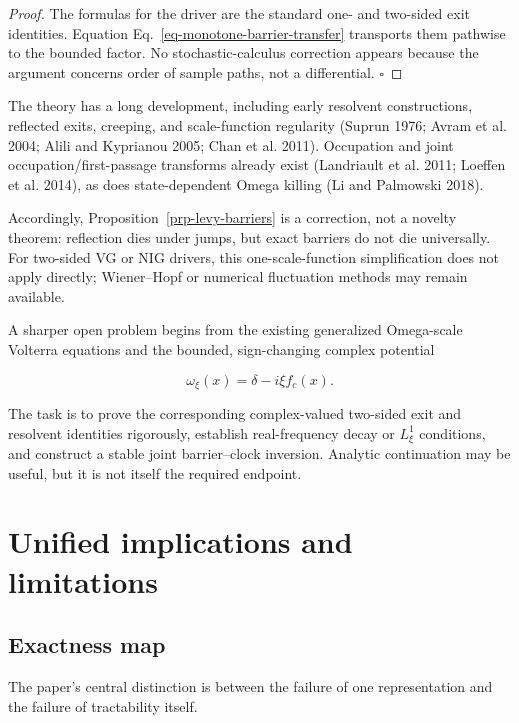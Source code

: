\documentclass[
  english,
  11pt,
  letterpaper,
  DIV=11,
  numbers=noendperiod]{scrartcl}
\theoremstyle{plain}
\theoremstyle{plain}
\theoremstyle{plain}
\theoremstyle{plain}
\theoremstyle{remark}
\begin{document}
\begin{proof}
The formulas for the driver are the standard one- and two-sided exit
identities. Equation Eq.~\ref{eq-monotone-barrier-transfer} transports
them pathwise to the bounded factor. No stochastic-calculus correction
appears because the argument concerns order of sample paths, not a
differential. \(\square\)
\end{proof}

The theory has a long development, including early resolvent
constructions, reflected exits, creeping, and scale-function regularity
(Suprun 1976; Avram et al. 2004; Alili and Kyprianou 2005; Chan et al.
2011). Occupation and joint occupation/first-passage transforms already
exist (Landriault et al. 2011; Loeffen et al. 2014), as does
state-dependent Omega killing (Li and Palmowski 2018).

Accordingly, Proposition~\ref{prp-levy-barriers} is a correction, not a
novelty theorem: reflection dies under jumps, but exact barriers do not
die universally. For two-sided VG or NIG drivers, this
one-scale-function simplification does not apply directly; Wiener--Hopf
or numerical fluctuation methods may remain available.

A sharper open problem begins from the existing generalized Omega-scale
Volterra equations and the bounded, sign-changing complex potential

\[
\omega_\xi(x)=\delta-i\xi f_c(x).
\]

The task is to prove the corresponding complex-valued two-sided exit and
resolvent identities rigorously, establish real-frequency decay or
\(L^1_\xi\) conditions, and construct a stable joint barrier--clock
inversion. Analytic continuation may be useful, but it is not itself the
required endpoint.

\section{Unified implications and limitations}\label{sec-implications}

\subsection{Exactness map}\label{exactness-map}

The paper's central distinction is between the failure of one
representation and the failure of tractability itself.
\end{document}
